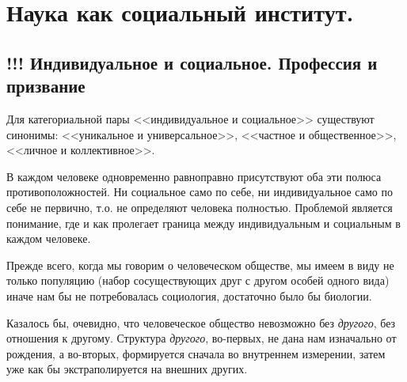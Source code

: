 \section{Наука как социальный институт.}

\subsection{!!! Индивидуальное и социальное. Профессия и призвание}

Для категориальной пары <<индивидуальное и социальное>> существуют синонимы: 
<<уникальное и универсальное>>, <<частное и общественное>>, <<личное и коллективное>>.
 
В каждом человеке одновременно равноправно присутствуют оба эти
полюса противоположностей. Ни социальное само по себе, ни индивидуальное само
по себе не первично, т.о. не определяют человека полностью. Проблемой является понимание, где и как пролегает граница между индивидуальным и социальным в каждом человеке. 



Прежде всего, когда мы говорим о человеческом
обществе, мы имеем в виду не только популяцию (набор сосуществующих друг с
другом особей одного вида) иначе нам бы не потребовалась социология, достаточно было бы биологии. 

Казалось бы, очевидно, что человеческое
общество невозможно без \textit{другого}, без
отношения к другому. Структура \textit{другого}, во-первых, не дана нам изначально от рождения, а во-вторых, формируется сначала во
внутреннем измерении, затем уже как бы экстраполируется на внешних других. 

